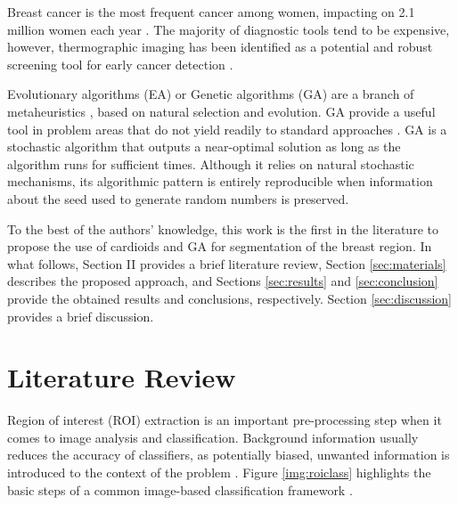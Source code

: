 \documentclass[conference]{IEEEtran}
\begin{document}
Breast cancer is the most frequent cancer among women, impacting on 2.1 million women each year \cite{ref04}. The majority of diagnostic tools tend to be expensive, however, thermographic imaging has been identified as a potential and robust screening tool for early cancer detection \cite{ref02, breast14}.

Evolutionary algorithms (EA) or Genetic algorithms (GA) are a branch of metaheuristics \cite{fractalIET}, based on natural selection and evolution. GA provide a useful tool in problem areas that do not yield readily to standard approaches \cite{ref05}. GA is a stochastic algorithm that outputs a near-optimal solution as long as the algorithm runs for sufficient times. Although it relies on natural stochastic mechanisms, its algorithmic pattern is entirely reproducible when information about the seed used to generate random numbers is preserved.

To the best of the authors' knowledge, this work is the first in the literature to propose the use of cardioids and GA for segmentation of the breast region. In what follows, Section II provides a brief literature review, Section \ref{sec:materials} describes the proposed approach, and Sections \ref{sec:results} and \ref{sec:conclusion} provide the obtained results and conclusions, respectively. Section \ref{sec:discussion} provides a brief discussion.



\section{Literature Review}

Region of interest (ROI) extraction \cite{roi16} is an important pre-processing step when it comes to image analysis and classification. Background information usually reduces the accuracy of classifiers, as potentially biased, unwanted information is introduced to the context of the problem \cite{novel16}. Figure \ref{img:roiclass} highlights the basic steps of a common image-based classification framework \cite{kMS}.
\end{document}
